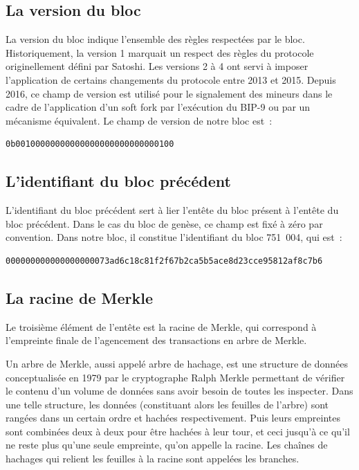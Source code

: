 
\subsection{La version du bloc} La version du bloc indique l'ensemble des règles respectées par le bloc. Historiquement, la version 1 marquait un respect des règles du protocole originellement défini par Satoshi. Les versions 2 à 4 ont servi à imposer l'application de certains changements du protocole entre 2013 et 2015. Depuis 2016, ce champ de version est utilisé pour le signalement des mineurs dans le cadre de l'application d'un soft fork par l'exécution du BIP-9 ou par un mécanisme équivalent. Le champ de version de notre bloc est~:

\begin{Verbatim}[fontsize=\footnotesize]
0b00100000000000000000000000000100
\end{Verbatim}


\subsection{L'identifiant du bloc précédent} L'identifiant du bloc précédent sert à lier l'entête du bloc présent à l'entête du bloc précédent. Dans le cas du bloc de genèse, ce champ est fixé à zéro par convention. Dans notre bloc, il constitue l'identifiant du bloc 751~004, qui est~:

\begin{Verbatim}[fontsize=\footnotesize]
000000000000000000073ad6c18c81f2f67b2ca5b5ace8d23cce95812af8c7b6
\end{Verbatim}


\subsection{La racine de Merkle} Le troisième élément de l'entête est la racine de Merkle, qui correspond à l'empreinte finale de l'agencement des transactions en arbre de Merkle.

Un arbre de Merkle, aussi appelé arbre de hachage, est une structure de données conceptualisée en 1979 par le cryptographe Ralph Merkle permettant de vérifier le contenu d'un volume de données sans avoir besoin de toutes les inspecter. Dans une telle structure, les données (constituant alors les feuilles de l'arbre) sont rangées dans un certain ordre et hachées respectivement. Puis leurs empreintes sont combinées deux à deux pour être hachées à leur tour, et ceci jusqu'à ce qu'il ne reste plus qu'une seule empreinte, qu'on appelle la racine. Les chaînes de hachages qui relient les feuilles à la racine sont appelées les branches.

